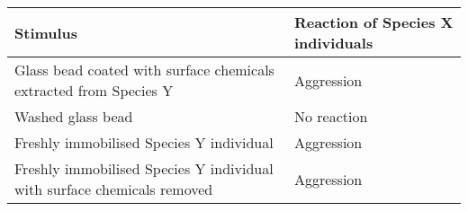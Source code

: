 \begin{table}[h!]
\centering
\begin{tabular}{|p{9cm}|p{5cm}|}
\hline
\textbf{Stimulus} & \textbf{Reaction of Species X individuals} \\
\hline
Glass bead coated with surface chemicals extracted from Species Y & Aggression \\
\hline
Washed glass bead & No reaction \\
\hline
Freshly immobilised Species Y individual & Aggression \\
\hline
Freshly immobilised Species Y individual with surface chemicals removed & Aggression \\
\hline
\end{tabular}
\end{table}
